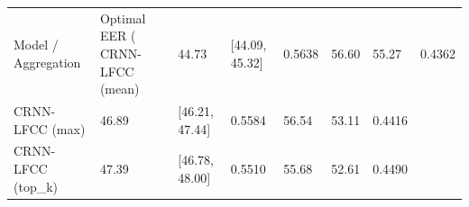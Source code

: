 \begin{tabular}{lllllll}
\toprule
Model / Aggregation & Optimal EER (%
\midrule
CRNN-LFCC (mean) & 44.73 & [44.09, 45.32] & 0.5638 & 56.60 & 55.27 & 0.4362 \\
CRNN-LFCC (max) & 46.89 & [46.21, 47.44] & 0.5584 & 56.54 & 53.11 & 0.4416 \\
CRNN-LFCC (top_k) & 47.39 & [46.78, 48.00] & 0.5510 & 55.68 & 52.61 & 0.4490 \\
\bottomrule
\end{tabular}
